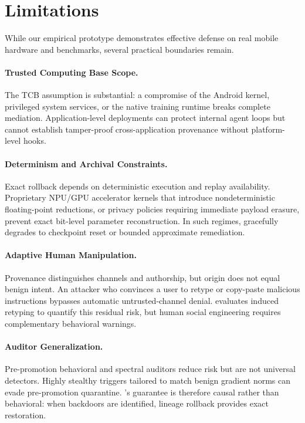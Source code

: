 \section{Limitations}
\label{sec:limitations}

While our empirical prototype demonstrates effective defense on real mobile hardware and benchmarks, several practical boundaries remain.

\paragraph{Trusted Computing Base Scope.}
The TCB assumption is substantial: a compromise of the Android kernel, privileged system services, or the native training runtime breaks complete mediation. Application-level deployments can protect internal agent loops but cannot establish tamper-proof cross-application provenance without platform-level hooks.

\paragraph{Determinism and Archival Constraints.}
Exact rollback depends on deterministic execution and replay availability. Proprietary NPU/GPU accelerator kernels that introduce nondeterministic floating-point reductions, or privacy policies requiring immediate payload erasure, prevent exact bit-level parameter reconstruction. In such regimes, \PG{} gracefully degrades to checkpoint reset or bounded approximate remediation.

\paragraph{Adaptive Human Manipulation.}
Provenance distinguishes channels and authorship, but origin does not equal benign intent. An attacker who convinces a user to retype or copy-paste malicious instructions bypasses automatic untrusted-channel denial. \PG{} evaluates induced retyping to quantify this residual risk, but human social engineering requires complementary behavioral warnings.

\paragraph{Auditor Generalization.}
Pre-promotion behavioral and spectral auditors reduce risk but are not universal detectors. Highly stealthy triggers tailored to match benign gradient norms can evade pre-promotion quarantine. \PG{}'s guarantee is therefore causal rather than behavioral: when backdoors are identified, lineage rollback provides exact restoration.
